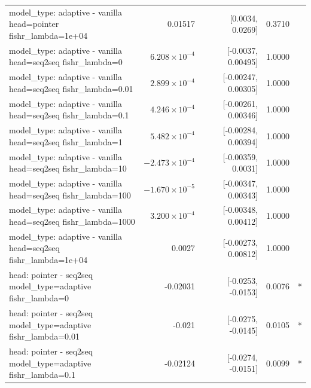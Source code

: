 \documentclass[10pt]{article}
\makeatletter
\newcommand{\stackcell}[1]{\begin{tabular}[t]{@{}l@{}}#1\end{tabular}}
\makeatother
\begin{document}
{\begin{longtable}{lrrrl}
\stackcell{model\_type: adaptive - vanilla\\\footnotesize head=pointer fishr\_lambda=1e+04 } & 0.01517 & [0.0034, 0.0269] & 0.3710 & \\
\stackcell{model\_type: adaptive - vanilla\\\footnotesize head=seq2seq fishr\_lambda=0 } & $6.208\times10^{-4}$ & [-0.0037, 0.00495] & 1.0000 & \\
\stackcell{model\_type: adaptive - vanilla\\\footnotesize head=seq2seq fishr\_lambda=0.01 } & $2.899\times10^{-4}$ & [-0.00247, 0.00305] & 1.0000 & \\
\stackcell{model\_type: adaptive - vanilla\\\footnotesize head=seq2seq fishr\_lambda=0.1 } & $4.246\times10^{-4}$ & [-0.00261, 0.00346] & 1.0000 & \\
\stackcell{model\_type: adaptive - vanilla\\\footnotesize head=seq2seq fishr\_lambda=1 } & $5.482\times10^{-4}$ & [-0.00284, 0.00394] & 1.0000 & \\
\stackcell{model\_type: adaptive - vanilla\\\footnotesize head=seq2seq fishr\_lambda=10 } & $-2.473\times10^{-4}$ & [-0.00359, 0.0031] & 1.0000 & \\
\stackcell{model\_type: adaptive - vanilla\\\footnotesize head=seq2seq fishr\_lambda=100 } & $-1.670\times10^{-5}$ & [-0.00347, 0.00343] & 1.0000 & \\
\stackcell{model\_type: adaptive - vanilla\\\footnotesize head=seq2seq fishr\_lambda=1000 } & $3.200\times10^{-4}$ & [-0.00348, 0.00412] & 1.0000 & \\
\stackcell{model\_type: adaptive - vanilla\\\footnotesize head=seq2seq fishr\_lambda=1e+04 } & 0.0027 & [-0.00273, 0.00812] & 1.0000 & \\
\stackcell{head: pointer - seq2seq\\\footnotesize model\_type=adaptive fishr\_lambda=0 } & -0.02031 & [-0.0253, -0.0153] & 0.0076 & *\\
\stackcell{head: pointer - seq2seq\\\footnotesize model\_type=adaptive fishr\_lambda=0.01 } & -0.021 & [-0.0275, -0.0145] & 0.0105 & *\\
\stackcell{head: pointer - seq2seq\\\footnotesize model\_type=adaptive fishr\_lambda=0.1 } & -0.02124 & [-0.0274, -0.0151] & 0.0099 & *\\

\end{longtable}}
\end{document}
